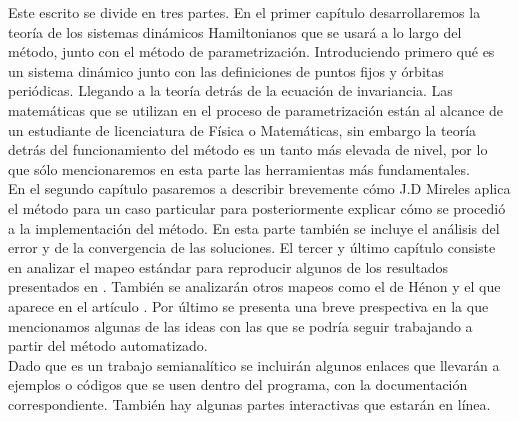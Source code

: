 Este escrito se divide en tres partes. En el primer capítulo desarrollaremos la teoría de los sistemas dinámicos Hamiltonianos que se usará a lo largo del método, junto con el método de parametrización. Introduciendo primero qué es un sistema dinámico junto con las definiciones de puntos fijos y órbitas periódicas. Llegando a la teoría detrás de la ecuación de invariancia. Las matemáticas que se utilizan en el proceso de parametrización están al alcance de un estudiante de licenciatura de Física o Matemáticas, sin embargo la teoría detrás del funcionamiento del método es un tanto más elevada de nivel, por lo que sólo mencionaremos en esta parte las herramientas más fundamentales.  \\


En el segundo capítulo pasaremos a describir brevemente cómo J.D Mireles aplica el método para un caso particular para posteriormente explicar cómo se procedió a la implementación del método. En esta parte también se incluye el análisis del error y de la convergencia de las soluciones. El tercer y último capítulo consiste en analizar el mapeo estándar para reproducir algunos de los resultados presentados en \cite{Mireles}. También se analizarán otros mapeos como el de Hénon y el que aparece en el artículo \cite{Jung}. Por último se presenta una breve prespectiva en la que mencionamos algunas de las ideas con las que se podría seguir trabajando a partir del método automatizado. \\

Dado que es un trabajo semianalítico se incluirán algunos enlaces que llevarán a ejemplos o códigos que se usen dentro del programa, con la documentación correspondiente. También hay algunas partes interactivas que estarán en línea. 

